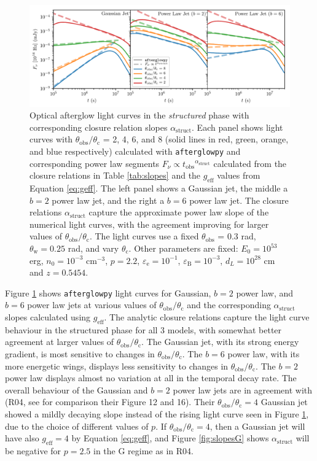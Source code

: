 \documentclass[twocolumn]{aastex62}
\newcommand{\afterglowpy}{{\tt afterglowpy}}
\newcommand{\tobs}{\ensuremath{t_{\mathrm{obs}}}}
\newcommand{\thobs}{\ensuremath{\theta_{\mathrm{obs}}}}
\newcommand{\thW}{\ensuremath{\theta_{\mathrm{w}}}}
\newcommand{\thC}{\ensuremath{\theta_{\mathrm{c}}}}
\newcommand{\epse}{\ensuremath{\varepsilon_{\mathrm{e}}}}
\newcommand{\epsB}{\ensuremath{\varepsilon_{\mathrm{B}}}}
\newcommand{\geff}{\ensuremath{g_{\mathrm{eff}}}}
\begin{document}
\begin{figure}
	\includegraphics[width=\textwidth]{figs/lc_closure_multi.pdf}
	\caption{Optical afterglow light curves in the \emph{structured} phase with corresponding closure relation slopes $\alpha_{\mathrm{struct}}$.  Each panel shows light curves with $\thobs/\thC$ = 2, 4, 6, and 8 (solid lines in red, green, orange, and blue respectively) calculated with \afterglowpy{} and corresponding power law segments $F_\nu \propto \tobs^{\alpha_{\mathrm{struct}}}$ calculated from the closure relations in Table \ref{tab:slopes} and the $\geff$ values from Equation \eqref{eq:geff}.  The left panel shows a Gaussian jet, the middle a $b=2$ power law jet, and the right a $b=6$ power law jet.  The closure relations $\alpha_{\mathrm{struct}}$ capture the approximate power law slope of the numerical light curves, with the agreement improving for larger values of $\thobs/\thC$. The light curves use a fixed $\thobs$ = 0.3 rad, $\thW = 0.25$ rad, and vary $\thC$.  Other parameters are fixed: $E_0 = 10^{53}$ erg, $n_0=10^{-3}$ cm$^{-3}$, $p=2.2$, $\epse = 10^{-1}$, $\epsB = 10^{-3}$, $d_L=10^{28}$ cm and $z=0.5454$. \label{fig:closure}}
\end{figure}

Figure \ref{fig:closure} shows \afterglowpy{} light curves for Gaussian, $b=2$ power law, and $b=6$ power law jets at various values of $\thobs / \thC$ and the corresponding $\alpha_{\mathrm{struct}}$ slopes calculated using $\geff$.  The analytic closure relations capture the light curve behaviour in the structured phase for all 3 models, with somewhat better agreement at larger values of $\thobs/\thC$.  The Gaussian jet, with its strong energy gradient, is most sensitive to changes in $\thobs/\thC$.  The $b=6$ power law, with its more energetic wings, displays less sensitivity to changes in $\thobs/\thC$.  The $b=2$ power law displays almost no variation at all in the temporal decay rate.  The overall behaviour of the Gaussian and $b=2$ power law jets are in agreement with \citet{Rossi:2004aa} (R04, see for comparison their Figure 12 and 16).  Their $\thobs/\thC = 4$ Gaussian jet showed a mildly decaying slope instead of the rising light curve seen in Figure \ref{fig:closure}, due to the choice of different values of $p$.  If $\thobs/\thC=4$, then a Gaussian jet will have also $\geff = 4$ by Equation \eqref{eq:geff}, and Figure \ref{fig:slopesG} shows $\alpha_{\mathrm{struct}}$ will be negative for $p=2.5$ in the G regime as in R04.
\end{document}
